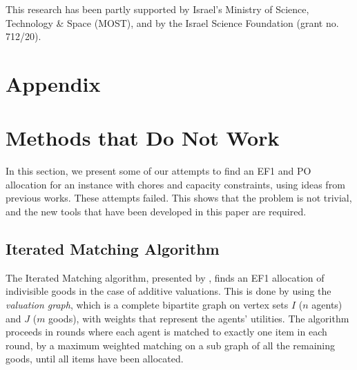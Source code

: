 \documentclass[sigconf]{aamas}
\theoremstyle{definition}
\begin{document}
\newpage 



\begin{acks}
This research has been partly supported by Israel's Ministry of Science, Technology \& Space (MOST), and by the Israel Science Foundation (grant no. 712/20).
\end{acks}



 


\clearpage
\appendix
\section*{Appendix}
\section{Methods that Do Not Work}
\label{app:dont-work}
In this section, we present some of our attempts to find an EF1 and PO allocation for an instance with chores and capacity constraints, using ideas from previous works.
These attempts failed. This shows that the problem is not trivial, and the new tools that have been developed in this paper are required.

\subsection{Iterated Matching Algorithm}
The Iterated Matching algorithm, presented by \citet{brustle2019}, finds an EF1 allocation of indivisible goods in the case of additive valuations.
This is done by using the \emph{valuation graph}, which is a complete bipartite graph on vertex sets $I$ ($n$ agents) and $J$ ($m$ goods), with weights that represent the agents' utilities.
The algorithm proceeds in rounds where each agent is matched to exactly one item in each round, by a maximum weighted matching on a sub graph of all the remaining goods, until all items have been allocated.
\end{document}
